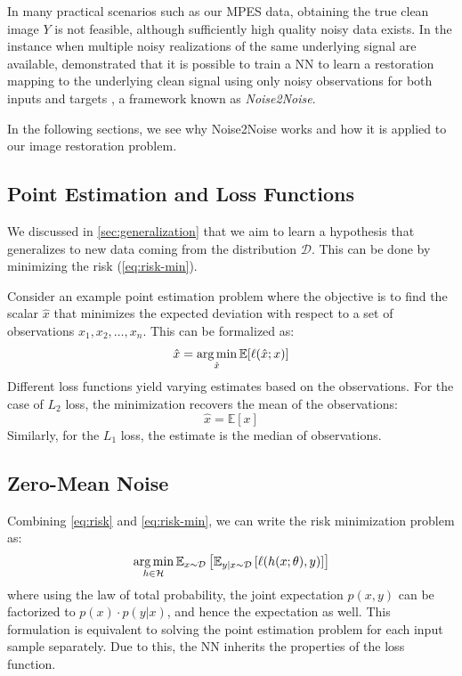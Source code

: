 In many practical scenarios such as our \gls{MPES} data, obtaining the true clean image $Y$ is not feasible, although sufficiently high quality noisy data exists. In the instance when multiple noisy realizations of the same underlying signal are available, \citeauthor{lehtinenNoise2NoiseLearningImage2018} demonstrated that it is possible to train a \gls{NN} to learn a restoration mapping to the underlying clean signal using only noisy observations for both inputs and targets \cite{lehtinenNoise2NoiseLearningImage2018}, a framework known as \textit{Noise2Noise}. 

In the following sections, we see why Noise2Noise works and how it is applied to our image restoration problem.
\subsection{Point Estimation and Loss Functions}
We discussed in \cref{sec:generalization} that we aim to learn a hypothesis that generalizes to new data coming from the distribution $\mathcal{D}$. This can be done by minimizing the risk (\cref{eq:risk-min}). 

Consider an example point estimation problem where the objective is to find the scalar $\hat{x}$ that minimizes the expected deviation with respect to a set of observations $x_1, x_2, \dots, x_n$. This can be formalized as:
\begin{equation}
    \hat{x} = \operatorname*{arg\,min}_{\hat{x}} \mathbb{E}[\ell(\hat{x}; x)]
\end{equation}
Different loss functions yield varying estimates based on the observations. For the case of $L_2$ loss, the minimization recovers the mean of the observations:
\begin{equation}\label{eq:l2-estimate}
    \hat{x} = \mathbb{E}[x]
\end{equation}
Similarly, for the $L_1$ loss, the estimate is the median of observations.

\subsection{Zero-Mean Noise}
Combining \cref{eq:risk} and \cref{eq:risk-min}, we can write the risk minimization problem as:
\begin{equation}
    \operatorname*{arg\,min}_{h \in \mathcal{H}} \mathbb{E}_{x \sim \mathcal{D}} \left[\mathbb{E}_{y|x \sim \mathcal{D}} \left[ \ell(h(x; \theta), y) \right]\right]
\end{equation}
where using the law of total probability, the joint expectation $p(x,y)$ can be factorized to $p(x) \cdot p(y | x)$, and hence the expectation as well. This formulation is equivalent to solving the point estimation problem for each input sample separately. Due to this, the \gls{NN} inherits the properties of the loss function.

